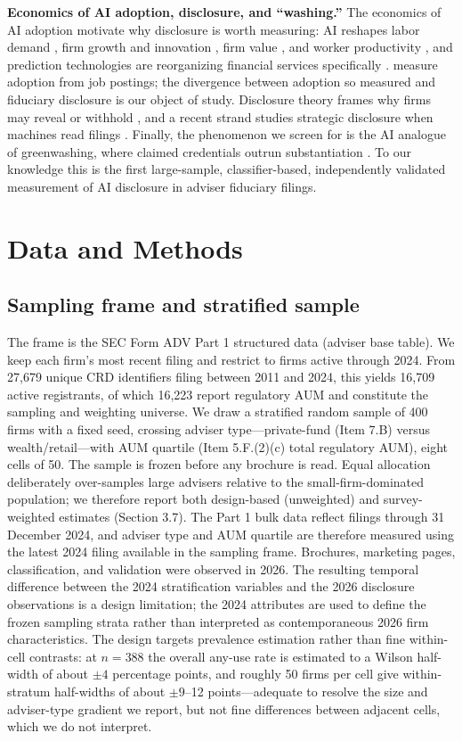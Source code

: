 \documentclass[utf8]{FrontiersinHarvard} %
\begin{document}
\textbf{Economics of AI adoption, disclosure, and ``washing.''} The economics of AI adoption motivate why disclosure is worth measuring: AI reshapes labor demand \citep{acemoglu2022}, firm growth and innovation \citep{babina2024}, firm value \citep{eisfeldt2023}, and worker productivity \citep{noy2023,brynjolfsson2025}, and prediction technologies are reorganizing financial services specifically \citep{agrawal2018,dacunto2019}. \citet{babina2024} measure adoption from job postings; the divergence between adoption so measured and fiduciary disclosure is our object of study. Disclosure theory frames why firms may reveal or withhold \citep{verrecchia2001,healy2001,leuz2016,blankespoor2020}, and a recent strand studies strategic disclosure when machines read filings \citep{cao2024}. Finally, the phenomenon we screen for is the AI analogue of greenwashing, where claimed credentials outrun substantiation \citep{delmas2011,lyon2015}. To our knowledge this is the first large-sample, classifier-based, independently validated measurement of AI disclosure in adviser fiduciary filings.

\section{Data and Methods}

\subsection{Sampling frame and stratified sample}
The frame is the SEC Form ADV Part 1 structured data (adviser base table). We keep each firm's most recent filing and restrict to firms active through 2024. From 27{,}679 unique CRD identifiers filing between 2011 and 2024, this yields 16{,}709 active registrants, of which 16{,}223 report regulatory AUM and constitute the sampling and weighting universe. We draw a stratified random sample of 400 firms with a fixed seed, crossing adviser type---private-fund (Item 7.B) versus wealth/retail---with AUM quartile (Item 5.F.(2)(c) total regulatory AUM), eight cells of 50. The sample is frozen before any brochure is read. Equal allocation deliberately over-samples large advisers relative to the small-firm-dominated population; we therefore report both design-based (unweighted) and survey-weighted estimates (Section 3.7). The Part 1 bulk data reflect filings through 31 December 2024, and adviser type and AUM quartile are therefore measured using the latest 2024 filing available in the sampling frame. Brochures, marketing pages, classification, and validation were observed in 2026. The resulting temporal difference between the 2024 stratification variables and the 2026 disclosure observations is a design limitation; the 2024 attributes are used to define the frozen sampling strata rather than interpreted as contemporaneous 2026 firm characteristics. The design targets prevalence estimation rather than fine within-cell contrasts: at $n = 388$ the overall any-use rate is estimated to a Wilson half-width of about $\pm 4$ percentage points, and roughly 50 firms per cell give within-stratum half-widths of about $\pm 9$--12 points---adequate to resolve the size and adviser-type gradient we report, but not fine differences between adjacent cells, which we do not interpret.
\end{document}

